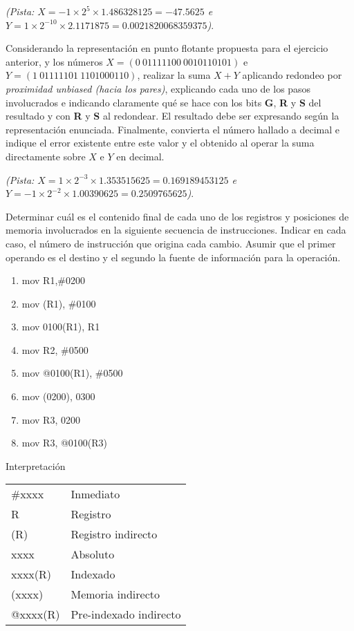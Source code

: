 \documentclass[12pt,a4paper]{article}
\begin{document}
\textit{(Pista: $X=-1 \times 2^{5} \times 1.486328125 = -47.5625$  e $Y= 1 \times 2^{-10} \times 2.1171875 = 0.0021820068359375$)}.

 Considerando la representación en punto flotante propuesta para el ejercicio anterior, y los números $X = (0 \ 01111100 \ 0010110101)$ e $Y = (1 \ 01111101 \ 1101000110)$, realizar la suma $X + Y$ aplicando redondeo por \textit{proximidad unbiased (hacia los pares)}, explicando cada uno de los pasos involucrados e indicando claramente qué se hace con los bits \textbf{G}, \textbf{R} y \textbf{S} del resultado y con \textbf{R} y \textbf{S} al redondear. El resultado debe ser expresando según la representación enunciada. Finalmente, convierta el número hallado a decimal e indique el error existente entre este valor y el obtenido al operar la suma directamente sobre $X$ e $Y$ en decimal. 

\textit{(Pista: $X=1 \times 2^{-3} \times 1.353515625 = 0.169189453125$ e $Y= -1 \times 2^{-2} \times 1.00390625 = 0.2509765625$)}.

 Determinar cuál es el contenido final de cada uno de los registros y posiciones de memoria involucrados en la siguiente secuencia de instrucciones. Indicar en cada caso, el número de instrucción que origina cada cambio. Asumir que el primer operando es el destino y el segundo la fuente de información para la operación.
\begin{center}
	\begin{minipage}{0.4\textwidth}
		\begin{enumerate}[(1)]
			\itemsep -5pt
			\item mov R1,\#0200
			\item mov (R1), \#0100
			\item mov 0100(R1), R1
			\item mov R2, \#0500
			\item mov @0100(R1), \#0500
			\item mov (0200), 0300
			\item mov R3, 0200
			\item mov R3, @0100(R3)
		\end{enumerate}
	\end{minipage}
	\begin{minipage}{0.4\textwidth}
		Interpretación
		\begin{tabular}{ll}
			\#xxxx   & Inmediato\\
			R       & Registro \\
			(R)     & Registro indirecto\\
			xxxx    & Absoluto \\
			xxxx(R) & Indexado \\
			(xxxx)  & Memoria indirecto\\
			@xxxx(R) & Pre-indexado indirecto
		\end{tabular}
	\end{minipage}
\end{center}
\end{document}
